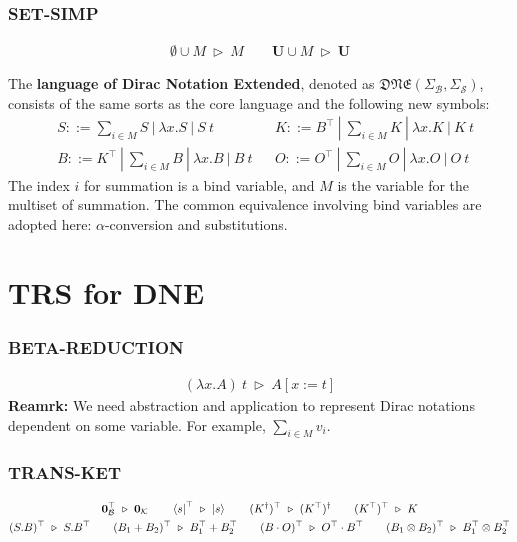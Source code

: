 \documentclass[manuscript, review, timestamp]{acmart}
\newcommand*{\reduce}{\ \triangleright\ }
\begin{document}
\subsubsection*{\textsf{SET-SIMP}}
\begin{gather*}
  \emptyset \cup M \reduce M
  \qquad
  \mathbf{U} \cup M \reduce \mathbf{U}
\end{gather*}

\begin{definition}[DNE]
    The \textbf{language of Dirac Notation Extended}, denoted as $\mathfrak{DNE}(\Sigma_\mathcal{B}, \Sigma_\mathcal{S})$, consists of the same sorts as the core language and the following new symbols:
    \begin{align*}
        & S ::= \sum_{i \in M} S\ |\ \lambda x.S\ |\ S\ t && K ::= B^\top\ |\ \sum_{i \in M} K\ |\ \lambda x.K\ |\ K\ t \\
        & B ::= K^\top\ |\ \sum_{i \in M} B\ |\ \lambda x.B\ |\ B\ t && O ::= O^\top\ |\ \sum_{i \in M} O\ |\ \lambda x.O\ |\ O\ t
    \end{align*}
    The index $i$ for summation is a bind variable, and $M$ is the variable for the multiset of summation. The common equivalence involving bind variables are adopted here: $\alpha$-conversion and substitutions.
\end{definition}

\section{TRS for DNE}

\subsubsection*{\textsf{BETA-REDUCTION}}
\begin{gather*}
  (\lambda x.A)\ t \reduce A[x:=t]
\end{gather*}
\textbf{Reamrk:} We need abstraction and application to represent Dirac notations dependent on some variable. For example, $\sum_{i \in M} v_i$.

\subsubsection*{\textsf{TRANS-KET}}
\begin{gather*}
  \mathbf{0}_\mathcal{B}^\top \reduce \mathbf{0}_\mathcal{K}
  \qquad
  \bra{s}^\top \reduce \ket{s}
  \qquad
  (K^\dagger)^\top \reduce (K^\top)^\dagger
  \qquad
  (K^\top)^\top \reduce K \\
  (S . B)^\top \reduce S . B^\top
  \qquad
  (B_1 + B_2)^\top \reduce B_1^\top + B_2^\top
  \qquad
  (B \cdot O)^\top \reduce O^\top \cdot B^\top
  \qquad
  (B_1 \otimes B_2)^\top \reduce B_1^\top \otimes B_2^\top
\end{gather*}
\end{document}
